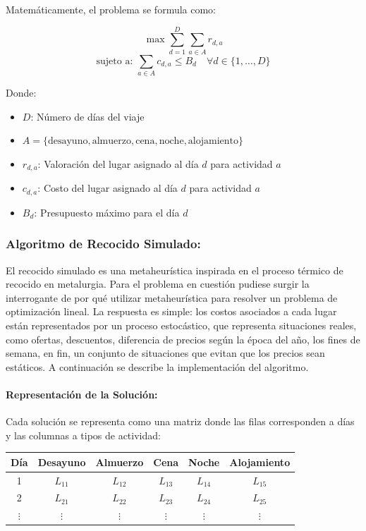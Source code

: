 \documentclass[10pt]{llncs}
\begin{document}
Matemáticamente, el problema se formula como:

\[
\max \sum_{d=1}^{D} \sum_{a \in A} r_{d,a}
\]
\[
\text{sujeto a: }
\sum_{a \in A} c_{d,a} \leq B_d \quad \forall d \in \{1,\dots,D\}
\]

Donde:
\begin{itemize}
    \item $D$: Número de días del viaje
    \item $A = \{\text{desayuno}, \text{almuerzo}, \text{cena}, \text{noche}, \text{alojamiento}\}$
    \item $r_{d,a}$: Valoración del lugar asignado al día $d$ para actividad $a$
    \item $c_{d,a}$: Costo del lugar asignado al día $d$ para actividad $a$
    \item $B_d$: Presupuesto máximo para el día $d$
\end{itemize}

\subsubsection{Algoritmo de Recocido Simulado:}
El recocido simulado es una metaheurística inspirada en el proceso térmico de recocido en metalurgia. Para el problema en cuestión pudiese surgir la 
interrogante de por qué utilizar metaheurística para resolver un problema de optimización lineal. La respuesta es simple: los costos asociados a cada 
lugar están representados por un proceso estocástico, que representa situaciones reales, como ofertas, descuentos, diferencia de precios según la época del año, los 
fines de semana, en fin, un conjunto de situaciones que evitan que los precios sean estáticos. A continuación se describe la implementación del algoritmo.

\paragraph{Representación de la Solución:}
Cada solución se representa como una matriz donde las filas corresponden a días y las columnas a tipos de actividad:

\begin{center}
\begin{tabular}{c|c|c|c|c|c}
Día & Desayuno & Almuerzo & Cena & Noche & Alojamiento \\
\midrule
1 & $L_{11}$ & $L_{12}$ & $L_{13}$ & $L_{14}$ & $L_{15}$ \\
2 & $L_{21}$ & $L_{22}$ & $L_{23}$ & $L_{24}$ & $L_{25}$ \\
$\vdots$ & $\vdots$ & $\vdots$ & $\vdots$ & $\vdots$ & $\vdots$ \\
\end{tabular}
\end{center}
\end{document}
